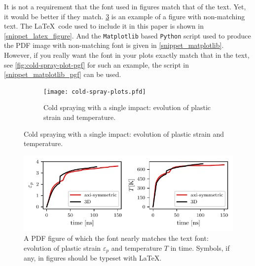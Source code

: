 \documentclass[authoryear,3p,times,preprint,review,fleqn]{elsarticle}
\numberwithin{equation}{section}
\theoremstyle{remark}
\begin{document}
It is not a requirement that the font used in figures match that of the text. Yet, it would be better if they match. \cref{fig:cold-spray-plot} is an example of a figure with non-matching text. The \LaTeX\ code used to include it in this paper is shown in \cref{snippet_latex_figure}. And the \texttt{Matplotlib} based \texttt{Python} script used to produce the PDF image with non-matching font is given in \cref{snippet_matplotlib}.
However, if you really want the font in your plots exactly match that in the text, see \cref{fig:cold-spray-plot-pgf} for such an example, the script in \cref{snippet_matplotlib_pgf} can be used.

\begin{figure}[!h]
  \begin{snippetlatex}[caption={\LaTeX\ commands to insert either a PDF image or a PGF one. The crucial point here is not to scale the inserted image.},label={snippet_latex_figure},framerule=1pt,tabsize=3]
    \begin{figure}[!ht]
      \centering
      \texttt{[image: cold-spray-plots.pfd]} %
      \caption{Cold spraying with a single impact: evolution of plastic strain and temperature.}
      \label{fig:cold-spray-plot}
    \end{figure}
  \end{snippetlatex}
\end{figure}

\begin{figure}[!h]
  \centering
  \includegraphics{cold-spray-plots}
  \caption{A PDF figure of which the font nearly matches the text font: 
  evolution of plastic strain $\varepsilon_p$ and temperature $T$ in time. Symbols, if any, in figures should be typeset with \LaTeX.}
  \label{fig:cold-spray-plot}
\end{figure}
\end{document}
